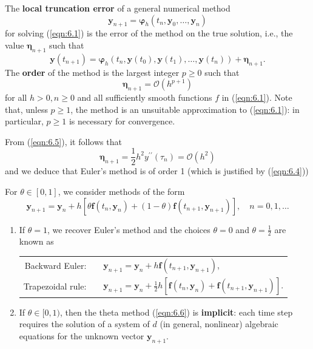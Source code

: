\documentclass[a4paper]{article}
\begin{document}
\begin{definition}
    The \textbf{local truncation error} of a general numerical method 
    \[
        \mathbf{y}_{n+1}=\boldsymbol{\varphi}_h\left(t_n, \mathbf{y}_0, \ldots, \mathbf{y}_n\right)
    \]
    for solving (\ref{eqn:6.1}) is the error of the method on the true solution, i.e., the value $\boldsymbol{\eta}_{n+1}$ such that
\[
\mathbf{y}\left(t_{n+1}\right)=\boldsymbol{\varphi}_h\left(t_n, \mathbf{y}\left(t_0\right), \mathbf{y}\left(t_1\right), \ldots, \mathbf{y}\left(t_n\right)\right)+\mathbf{\boldsymbol{\eta}}_{n+1} .
\]
The \textbf{order} of the method is the largest integer $p \geq 0$ such that
\[
\boldsymbol{\eta}_{n+1}=\mathcal{O}\left(h^{p+1}\right)
\]
for all $h>0, n \geq 0$ and all sufficiently smooth functions $f$ in (\ref{eqn:6.1}). Note that, unless $p \geq 1$, the method is an unsuitable approximation to (\ref{eqn:6.1}): in particular, $p \geq 1$ is necessary for convergence.
\end{definition}

\begin{remark}
    From (\ref{eqn:6.5}), it follows that
\[
\boldsymbol{\eta}_{n+1}=\frac{1}{2} h^2 y^{\prime \prime}\left(\tau_n\right)=\mathcal{O}\left(h^2\right)
\]
and we deduce that Euler's method is of order 1 (which is justified by (\ref{eqn:6.4}))
\end{remark}

\begin{definition}\label{def:theta_methods}
    For $\theta \in[0,1]$, we consider methods of the form
\begin{equation}\label{eqn:6.6}
    \mathbf{y}_{n+1}=\mathbf{y}_n+h\left[\theta \mathbf{f}\left(t_n, \mathbf{y}_n\right)+(1-\theta) \mathbf{f}\left(t_{n+1}, \mathbf{y}_{n+1}\right)\right], \quad n=0,1, \ldots
\end{equation}
\begin{enumerate}[(1)]
    \item If $\theta=1$, we recover Euler's method and the choices $\theta=0$ and $\theta=\frac{1}{2}$ are known as
    \begin{center}
    \begin{tabular}{rl}
        Backward Euler: & $\quad \mathbf{y}_{n+1}=\mathbf{y}_n+h \mathbf{f}\left(t_{n+1}, \mathbf{y}_{n+1}\right)$,\\[.5em]
        Trapezoidal rule: & $\quad \mathbf{y}_{n+1}=\mathbf{y}_n+\frac{1}{2} h\left[\mathbf{f}\left(t_n, \mathbf{y}_n\right)+\mathbf{f}\left(t_{n+1}, \mathbf{y}_{n+1}\right)\right]$.
    \end{tabular}
    \end{center}
    \item If $\theta \in[0,1)$, then the theta method (\ref{eqn:6.6}) is \textbf{implicit}: each time step requires the solution of a system of $d$ (in general, nonlinear) algebraic equations for the unknown vector $\mathbf{y}_{n+1}$.
\end{enumerate}
\end{definition}
\end{document}
